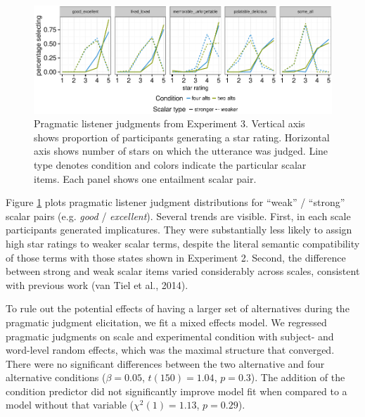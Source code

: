 \documentclass[10pt, letterpaper]{article}
\newenvironment{CodeChunk}{}{}
\begin{document}
\begin{CodeChunk}
\begin{figure}[t]

{\centering \includegraphics{figs/exp2Plots-1} 

}

\caption[Pragmatic listener judgments from Experiment 3]{Pragmatic listener judgments from Experiment 3. Vertical axis shows proportion of participants generating a star rating. Horizontal axis shows number of stars on which the utterance was judged. Line type denotes condition and colors indicate the particular scalar items. Each panel shows one entailment scalar pair.}\label{fig:exp2Plots}
\end{figure}
\end{CodeChunk}

Figure \ref{fig:exp2Plots} plots pragmatic listener judgment
distributions for ``weak'' / ``strong'' scalar pairs (e.g. \emph{good} /
\emph{excellent}). Several trends are visible. First, in each scale
participants generated implicatures. They were substantially less likely
to assign high star ratings to weaker scalar terms, despite the literal
semantic compatibility of those terms with those states shown in
Experiment 2. Second, the difference between strong and weak scalar
items varied considerably across scales, consistent with previous work
(van Tiel et al., 2014).

To rule out the potential effects of having a larger set of alternatives
during the pragmatic judgment elicitation, we fit a mixed effects model.
We regressed pragmatic judgments on scale and experimental condition
with subject- and word-level random effects, which was the maximal
structure that converged. There were no significant differences between
the two alternative and four alternative conditions (\(\beta = 0.05\),
\(t(150) = 1.04\), \(p = 0.3\)). The addition of the condition predictor
did not significantly improve model fit when compared to a model without
that variable (\(\chi^2(1) = 1.13\), \(p = 0.29\)).
\end{document}
